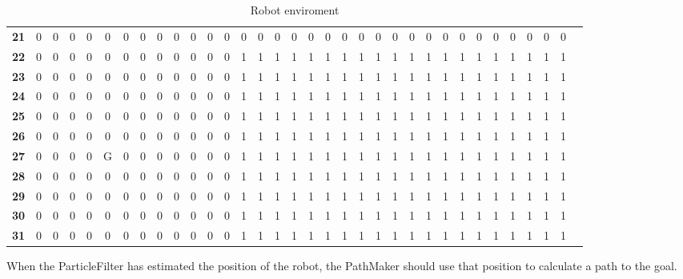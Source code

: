 \documentclass[Main]{subfiles}
\begin{document}
\begin{table}[H]
{\begin{tabular}{cccccccccccccccccccccccccccccccccc}
			\textbf{21} &  0 &  0 &  0 &  0 &  0 &  0 &  0 &  0 &  0 &  0 &  0 &  0 &  0 &  0 &  0 &  0 &  0 &  0 &  0 &  0 &  0 &  0 &  0 &  0 &  0 &  0 &  0 &  0 &  0 &  0 &  0 &  0 \\
			\textbf{22} &  0 &  0 &  0 &  0 &  0 &  0 &  0 &  0 &  0 &  0 &  0 &  0 &  1 &  1 &  1 &  1 &  1 &  1 &  1 &  1 &  1 &  1 &  1 &  1 &  1 &  1 &  1 &  1 &  1 &  1 &  1 &  1 \\
			\textbf{23} &  0 &  0 &  0 &  0 &  0 &  0 &  0 &  0 &  0 &  0 &  0 &  0 &  1 &  1 &  1 &  1 &  1 &  1 &  1 &  1 &  1 &  1 &  1 &  1 &  1 &  1 &  1 &  1 &  1 &  1 &  1 &  1 \\
			\textbf{24} &  0 &  0 &  0 &  0 &  0 &  0 &  0 &  0 &  0 &  0 &  0 &  0 &  1 &  1 &  1 &  1 &  1 &  1 &  1 &  1 &  1 &  1 &  1 &  1 &  1 &  1 &  1 &  1 &  1 &  1 &  1 &  1 \\
			\textbf{25} &  0 &  0 &  0 &  0 &  0 &  0 &  0 &  0 &  0 &  0 &  0 &  0 &  1 &  1 &  1 &  1 &  1 &  1 &  1 &  1 &  1 &  1 &  1 &  1 &  1 &  1 &  1 &  1 &  1 &  1 &  1 &  1 \\
			\textbf{26} &  0 &  0 &  0 &  0 &  0 &  0 &  0 &  0 &  0 &  0 &  0 &  0 &  1 &  1 &  1 &  1 &  1 &  1 &  1 &  1 &  1 &  1 &  1 &  1 &  1 &  1 &  1 &  1 &  1 &  1 &  1 &  1 \\
			\textbf{27} &  0 &  0 &  0 &  0 &  G &  0 &  0 &  0 &  0 &  0 &  0 &  0 &  1 &  1 &  1 &  1 &  1 &  1 &  1 &  1 &  1 &  1 &  1 &  1 &  1 &  1 &  1 &  1 &  1 &  1 &  1 &  1 \\
			\textbf{28} &  0 &  0 &  0 &  0 &  0 &  0 &  0 &  0 &  0 &  0 &  0 &  0 &  1 &  1 &  1 &  1 &  1 &  1 &  1 &  1 &  1 &  1 &  1 &  1 &  1 &  1 &  1 &  1 &  1 &  1 &  1 &  1 \\
			\textbf{29} &  0 &  0 &  0 &  0 &  0 &  0 &  0 &  0 &  0 &  0 &  0 &  0 &  1 &  1 &  1 &  1 &  1 &  1 &  1 &  1 &  1 &  1 &  1 &  1 &  1 &  1 &  1 &  1 &  1 &  1 &  1 &  1 \\
			\textbf{30} &  0 &  0 &  0 &  0 &  0 &  0 &  0 &  0 &  0 &  0 &  0 &  0 &  1 &  1 &  1 &  1 &  1 &  1 &  1 &  1 &  1 &  1 &  1 &  1 &  1 &  1 &  1 &  1 &  1 &  1 &  1 &  1 \\
			\textbf{31} &  0 &  0 &  0 &  0 &  0 &  0 &  0 &  0 &  0 &  0 &  0 &  0 &  1 &  1 &  1 &  1 &  1 &  1 &  1 &  1 &  1 &  1 &  1 &  1 &  1 &  1 &  1 &  1 &  1 &  1 &  1 &  1 \\
			\end{tabular}
		}
		\caption{Robot enviroment}
		\label{table:realmap} 
	\end{table} \noindent	
	When the ParticleFilter has estimated the position of the robot, the PathMaker should use that position to calculate a path to the goal.
	
\end{document}
